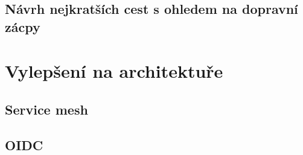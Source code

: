 \documentclass[thesis=M,czech]{FITthesis}[2019/12/23]
\theoremstyle{plain}
\theoremstyle{definition}
\begin{document}
\subsection{Návrh nejkratších cest s ohledem na dopravní zácpy}




\section{Vylepšení na architektuře}



\subsection{Service mesh}


\subsection{OIDC}




\begin{conclusion}
\end{conclusion}




\end{document}
